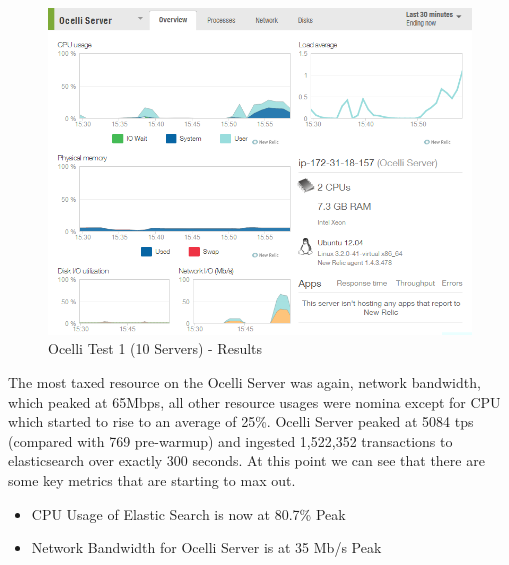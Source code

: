 \documentclass{llncs}
\begin{document}
\begin{figure}[h]
    \centering
    \includegraphics[scale=0.7]{app6}
    \caption{Ocelli Test 1 (10 Servers) - Results}
    \label{fig:ocelli_dm}
\end{figure}

The most taxed resource on the Ocelli Server was again, network bandwidth, which peaked at 65Mbps, all other resource usages were nomina except for CPU which started to rise to an average of 25\%. Ocelli Server peaked at 5084 tps (compared with 769 pre-warmup) and ingested 1,522,352 transactions to elasticsearch over exactly 300 seconds. At this point we can see that there are some key metrics that are starting to max out.

\begin{itemize}
\item CPU Usage of Elastic Search is now at 80.7\% Peak
\item Network Bandwidth for Ocelli Server is at 35 Mb/s Peak
\end{itemize}
\end{document}
